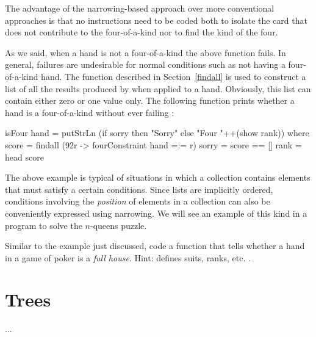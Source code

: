 The advantage of the narrowing-based approach
over more conventional approaches is that no instructions need to
be coded both to isolate the card that does not contribute to
the four-of-a-kind nor to find the kind of the four.

As we said, when a hand is not a four-of-a-kind the above function fails.
In general, failures are undesirable for normal conditions
such as not having a four-of-a-kind hand.
The function  described in Section~\ref{findall}
is used to construct a list
of all the results produced by
 when applied to a hand.
Obviously, this list can contain either zero or one value only.
The following function prints whether a hand is a four-of-a-kind
without ever failing
:
%
\begin{prog}
isFour hand = putStrLn (if sorry then "Sorry" else "Four "++(show rank))
              where score = findall (\char92r -> fourConstraint hand =:= r)
                    sorry = score == []
                    rank  = head score
\end{prog}
%
The above example is typical of situations in which a collection
contains elements that must satisfy a certain conditions.
Since lists are implicitly ordered, conditions involving
the \emph{position} of elements in a collection can also be
conveniently expressed using narrowing.
We will see an example of this kind in a program to
solve the $n$-queens puzzle.

\begin{exercise}
Similar to the example just discussed, code a function
that tells whether a hand in a game of poker is a
\emph{full house}.
Hint: 
defines suits, ranks, etc.
.
\end{exercise}

\section{Trees}

...
% 

